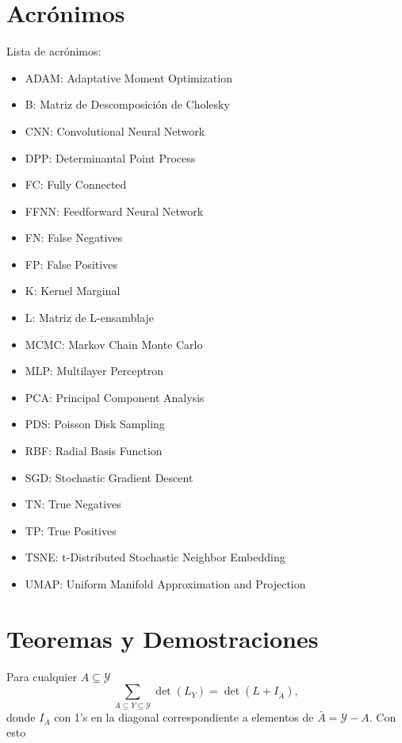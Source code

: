 \begin{appendixs}

    \section{Acrónimos}
    
    Lista de acrónimos: 
    
    \begin{itemize}
        \item ADAM: Adaptative Moment Optimization
        \item B: Matriz de Descomposición de Cholesky 
        \item CNN: Convolutional Neural Network
        \item DPP: Determinantal Point Process 
        \item FC: Fully Connected
        \item FFNN: Feedforward Neural Network
        \item FN: False Negatives
        \item FP: False Positives
        \item K: Kernel Marginal 
        \item L: Matriz de L-ensamblaje 
        \item MCMC: Markov Chain Monte Carlo
        \item MLP: Multilayer Perceptron
        \item PCA: Principal Component Analysis
        \item PDS: Poisson Disk Sampling
        \item RBF: Radial Basis Function
        \item SGD: Stochastic Gradient Descent
        \item TN: True Negatives
        \item TP: True Positives
        \item TSNE: t-Distributed Stochastic Neighbor Embedding
        \item UMAP: Uniform Manifold Approximation and Projection
        
    \end{itemize}


    \section{Teoremas y Demostraciones}

    
    \begin{teo} \hypertarget{Teorema B.1}{}
    Para cualquier $A \subseteq \mathcal{Y}$ 
    \[ \sum_{A \subseteq Y \subseteq \mathcal{Y}}\det(L_Y) = \det(L + I_{\bar{A}}) ,  \]
    donde $I_{\bar{A}}$ con 1's en la diagonal correspondiente a elementos de $\bar{A} = \mathcal{Y} - A$. Con esto 
    

\end{teo}
\end{appendixs}
